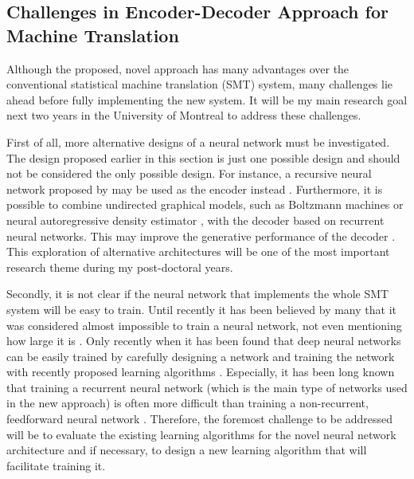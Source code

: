\documentclass[11pt, oneside]{essay}
\begin{document}
\subsection{Challenges in Encoder-Decoder Approach for
Machine Translation}
\label{sec:challenges}

Although the proposed, novel approach has many advantages over
the conventional statistical machine translation (SMT) system,
many challenges lie ahead before fully implementing the new
system. It will be my main research goal next two years in
the University of Montreal to address these challenges.

First of all, more alternative designs of a neural network must
be investigated. The design proposed earlier in this section is
just one possible design and should not be considered the only
possible design. For instance, a recursive neural network
proposed by \citet{Socher2011} may be used as the encoder instead
\citep{Kalchbrenner2012}. Furthermore, it is possible to combine
undirected graphical models, such as Boltzmann machines
\citep{Ackley1985} or neural autoregressive density estimator
\citep[NADE,][]{Larochelle2011}, with the decoder based on
recurrent neural networks. This may improve the generative
performance of the decoder \citep[see, e.g.,][]{Bengio2013rec}.
This exploration of alternative architectures will be one of the
most important research theme during my post-doctoral years.
      
Secondly, it is not clear if the neural network that
implements the whole SMT system will be easy to train. Until
recently it has been believed by many that it was considered
almost impossible to train a neural
network, not even mentioning how large it is \citep[see,
e.g.,][]{Bengio2009a}. Only recently when it has been found that
deep neural networks can be easily trained by carefully designing
a network \citep[see,
e.g.,][]{Hinton2012sp,Goodfellow2013,Gulcehre2013} and training
the network with recently proposed learning algorithms \citep[see,
e.g.,][]{Martens2012,Hinton2012,Amari1998}. Especially, it has
been long known that training
a recurrent neural network (which is the
main type of networks used in the new approach) is
often more difficult than training a non-recurrent,
feedforward neural network \citep[see,
e.g.,][]{Bengio1994,Sutskever2011,hochreiter1997long}. Therefore,
the foremost challenge to be addressed will be to evaluate
the existing learning algorithms for the novel neural network
architecture and if necessary, to design a new learning
algorithm that will facilitate training it.
\end{document}
